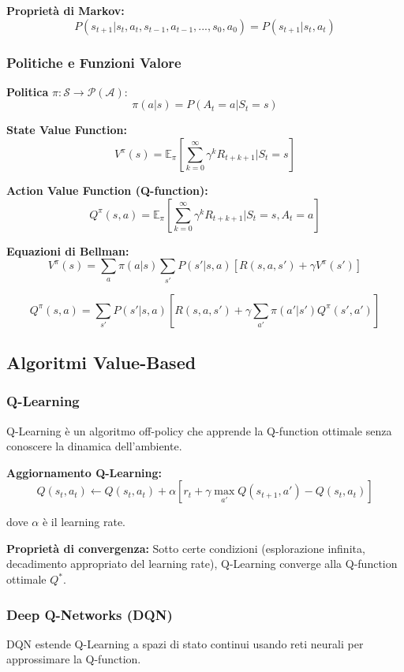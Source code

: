 \documentclass[12pt,a4paper,twoside]{report}
\begin{document}
\textbf{Proprietà di Markov:}
$$P(s_{t+1} | s_t, a_t, s_{t-1}, a_{t-1}, ..., s_0, a_0) = P(s_{t+1} | s_t, a_t)$$

\subsubsection{Politiche e Funzioni Valore}

\textbf{Politica} $\pi: \mathcal{S} \rightarrow \mathcal{P}(\mathcal{A})$:
$$\pi(a|s) = P(A_t = a | S_t = s)$$

\textbf{State Value Function:}
$$V^{\pi}(s) = \mathbb{E}_{\pi}[\sum_{k=0}^{\infty} \gamma^k R_{t+k+1} | S_t = s]$$

\textbf{Action Value Function (Q-function):}
$$Q^{\pi}(s,a) = \mathbb{E}_{\pi}[\sum_{k=0}^{\infty} \gamma^k R_{t+k+1} | S_t = s, A_t = a]$$

\textbf{Equazioni di Bellman:}
$$V^{\pi}(s) = \sum_{a} \pi(a|s) \sum_{s'} P(s'|s,a)[R(s,a,s') + \gamma V^{\pi}(s')]$$

$$Q^{\pi}(s,a) = \sum_{s'} P(s'|s,a)[R(s,a,s') + \gamma \sum_{a'} \pi(a'|s') Q^{\pi}(s',a')]$$

\subsection{Algoritmi Value-Based}

\subsubsection{Q-Learning}

Q-Learning è un algoritmo off-policy che apprende la Q-function ottimale senza conoscere la dinamica dell'ambiente.

\textbf{Aggiornamento Q-Learning:}
$$Q(s_t, a_t) \leftarrow Q(s_t, a_t) + \alpha [r_t + \gamma \max_{a'} Q(s_{t+1}, a') - Q(s_t, a_t)]$$

dove $\alpha$ è il learning rate.

\textbf{Proprietà di convergenza:}
Sotto certe condizioni (esplorazione infinita, decadimento appropriato del learning rate), Q-Learning converge alla Q-function ottimale $Q^*$.

\subsubsection{Deep Q-Networks (DQN)}

DQN estende Q-Learning a spazi di stato continui usando reti neurali per approssimare la Q-function.
\end{document}

